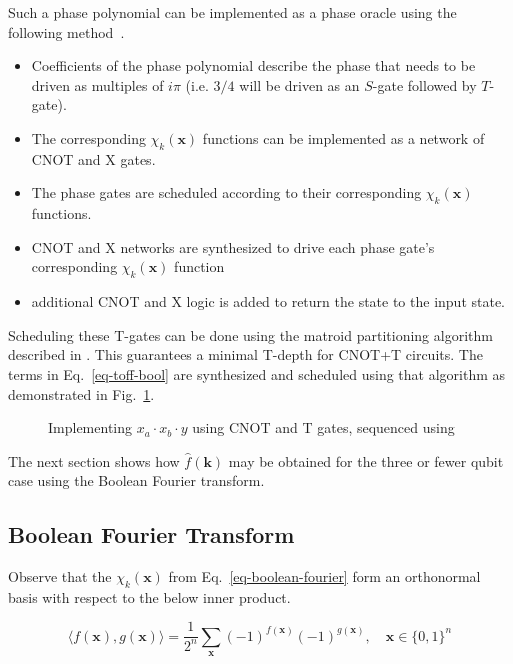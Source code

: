 Such a phase polynomial can be implemented as a phase oracle using the following
method~\cite{amy-meet-in-middle}.

\begin{itemize}
\item Coefficients of the phase polynomial describe the phase that needs to be driven
  as multiples of $i\pi$ (i.e. $3/4$ will be driven as an $S$-gate followed by $T$-gate).
\item The corresponding $\chi_k(\mathbf{x})$ functions can be implemented as a network
  of CNOT and X gates.
\item The phase gates are scheduled according to their corresponding $\chi_k(\mathbf{x})$
  functions.
\item CNOT and X networks are synthesized to drive each phase gate's corresponding
  $\chi_k(\mathbf{x})$ function
\item additional CNOT and X logic is added to return the state to the input state.
\end{itemize}

Scheduling these T-gates can be done using the matroid partitioning algorithm described in
\cite{bib-amy-matroid}. This guarantees a minimal T-depth for CNOT+T circuits.
The terms in Eq.~\ref{eq-toff-bool} are synthesized and scheduled using that algorithm as
demonstrated in Fig.~\ref{fig-toff-mark-matroid}.

\begin{figure}[t]
  \centering
  \scalebox{0.7} {
    
  }
  \caption{Implementing $x_a \cdot x_b \cdot y$ using CNOT and T gates, sequenced using~\cite{bib-amy-matroid}}
  \label{fig-toff-mark-matroid}
\end{figure}

The next section shows how $\hat{f}(\mathbf{k})$ may be obtained for the three or fewer qubit case using the
Boolean Fourier transform.

\subsection{Boolean Fourier Transform}
\label{Pre:Four}
Observe that the $\chi_k(\mathbf{x})$ from Eq.~\ref{eq-boolean-fourier} form an orthonormal basis with respect
to the below inner product.

\begin{equation}
  \label{eq-inner-prod}
  \langle f(\mathbf{x}) , g(\mathbf{x}) \rangle = \frac{1}{2^n} \sum_{\mathbf{x}} (-1)^{f(\mathbf{x})} (-1)^{g(\mathbf{x})}, \quad \mathbf{x} \in \{0,1\}^n
\end{equation}

